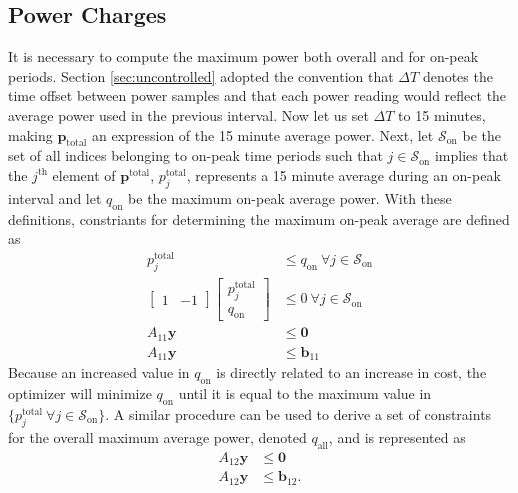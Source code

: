 \subsection{Power Charges}
It is necessary to compute the maximum power both overall and for on-peak periods. Section \ref{sec:uncontrolled} adopted the convention that $\Delta T$ denotes the time offset between power samples and that each power reading would reflect the average power used in the previous interval. Now let us set $\Delta T$ to 15 minutes, making $\mathbf{p}_{\text{total}}$ an expression of the 15 minute average power. Next, let $\mathcal{S}_{\text{on}}$ be the set of all indices belonging to on-peak time periods such that $j\in \mathcal{S}_{\text{on}}$ implies that the $j^{\text{th}}$ element of $\mathbf{p}^{\text{total}}$, $p_j^{\text{total}}$, represents a 15 minute average during an on-peak interval and let $q_{\text{on}}$ be the maximum on-peak average power.  With these definitions, constriants for determining the maximum on-peak average are defined as
\begin{equation} \begin{aligned}
	p_j^{\text{total}} &\le q_{\text{on}} \ \forall j \in \mathcal{S}_{\text{on}} \\
	\begin{bmatrix} 1 & -1\end{bmatrix} \begin{bmatrix}p_j^{\text{total}} \\ q_{\text{on}} \end{bmatrix} &\le 0 \ \forall j \in \mathcal{S}_{\text{on}}\\
		A_{11}\mathbf{y} &\le \mathbf{0} \\
		A_{11}\mathbf{y} &\le \mathbf{b}_{11}
\end{aligned} \end{equation}
Because an increased value in $q_{\text{on}}$ is directly related to an increase in cost, the optimizer will minimize $q_{\text{on}}$ until it is equal to the maximum value in $\{p_j^{\text{total}} \ \forall j \in \mathcal{S}_{\text{on}}\}$. A similar procedure can be used to derive a set of constraints for the overall maximum average power, denoted $q_{\text{all}}$, and is represented as
\begin{equation} \begin{aligned}
	A_{12}\mathbf{y} &\le  \mathbf{0} \\
	A_{12}\mathbf{y} &\le \mathbf{b}_{12}.
\end{aligned} \end{equation}
